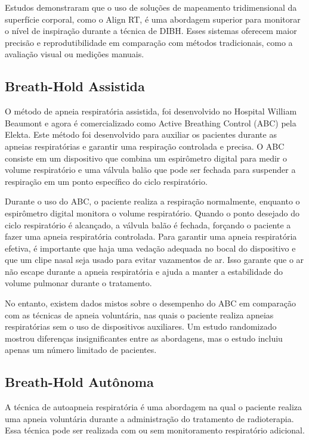 \documentclass[11pt,a4paper]{article}
\begin{document}
	Estudos demonstraram que o uso de soluções de mapeamento tridimensional da superfície corporal, como o Align RT, é uma abordagem superior para monitorar o nível de inspiração durante a técnica de DIBH. Esses sistemas oferecem maior precisão e reprodutibilidade em comparação com métodos tradicionais, como a avaliação visual ou medições manuais.

\subsection*{Breath-Hold Assistida}

	O método de apneia respiratória assistida, foi desenvolvido no Hospital William Beaumont e agora é comercializado como Active Breathing Control (ABC) pela Elekta. Este método foi desenvolvido para auxiliar os pacientes durante as apneias respiratórias e garantir uma respiração controlada e precisa. O ABC consiste em um dispositivo que combina um espirômetro digital para medir o volume respiratório e uma válvula balão que pode ser fechada para suspender a respiração em um ponto específico do ciclo respiratório.

	Durante o uso do ABC, o paciente realiza a respiração normalmente, enquanto o espirômetro digital monitora o volume respiratório. Quando o ponto desejado do ciclo respiratório é alcançado, a válvula balão é fechada, forçando o paciente a fazer uma apneia respiratória controlada. Para garantir uma apneia respiratória efetiva, é importante que haja uma vedação adequada no bocal do dispositivo e que um clipe nasal seja usado para evitar vazamentos de ar. Isso garante que o ar não escape durante a apneia respiratória e ajuda a manter a estabilidade do volume pulmonar durante o tratamento.

	No entanto, existem dados mistos sobre o desempenho do ABC em comparação com as técnicas de apneia voluntária, nas quais o paciente realiza apneias respiratórias sem o uso de dispositivos auxiliares. Um estudo randomizado mostrou diferenças insignificantes entre as abordagens, mas o estudo incluiu apenas um número limitado de pacientes.

\subsection*{Breath-Hold Autônoma}

	A técnica de autoapneia respiratória é uma abordagem na qual o paciente realiza uma apneia voluntária durante a administração do tratamento de radioterapia. Essa técnica pode ser realizada com ou sem monitoramento respiratório adicional. 
\end{document}
